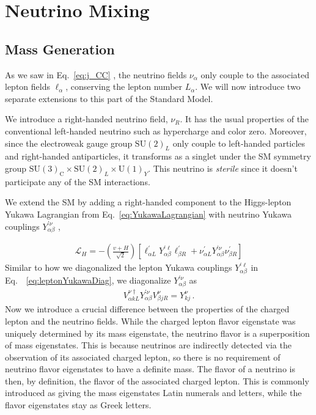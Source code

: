 %
%

\section{Neutrino Mixing}\label{ch:oscillation}
\subsection{Mass Generation}
As we saw in Eq.~\ref{eq:j_CC}
, the neutrino fields $\nu_\alpha$ only couple to the associated lepton fields $\ell_\alpha$, conserving the lepton number $L_\alpha$. We will now introduce two separate extensions to this part of the Standard Model.

We introduce a right-handed neutrino field, $\nu_R$. It has the usual properties of the conventional left-handed neutrino such as hypercharge and color zero. Moreover, since the electroweak gauge group $\text{SU}(2)_L$ only couple to left-handed particles and right-handed antiparticles, it transforms as a singlet under the SM symmetry group $\mathrm{SU}(3)_{\mathrm{C}} \times \mathrm{SU}(2)_{L} \times \mathrm{U}(1)_{Y}$. This neutrino is \emph{sterile} since it doesn't participate any of the SM interactions. 

We extend the SM by adding a right-handed component to the Higgs-lepton Yukawa Lagrangian from Eq.~\ref{eq:YukawaLagrangian} with neutrino Yukawa couplings $Y_{\alpha \beta}^{\prime \nu}$ ,

\begin{align}
    \mathcal{L}_{H}=-\left( \frac{v + H}{\sqrt{2}} \right) \left[\ell_{\alpha L}^{\prime} Y_{\alpha \beta}^{\prime \ell} \ell_{\beta R}^{\prime} + \nu_{\alpha L}^{\prime} Y_{\alpha \beta}^{\prime \nu} \nu_{\beta R}^{\prime}\right]
\end{align}
Similar to how we diagonalized the lepton Yukawa couplings $Y_{\alpha \beta}^{\prime \ell}$ in Eq.~~\ref{eq:leptonYukawaDiag}, we diagonalize $Y_{\alpha \beta}^{\prime \nu}$ as
\begin{align}
    V_{\alpha k L}^{\nu \dagger} Y^{\prime \nu}_{\alpha \beta} V_{\beta j R}^{\nu}=Y^{\nu}_{kj} \,.
\end{align}
Now we introduce a crucial difference between the properties of the charged lepton and the neutrino fields.
While the charged lepton flavor eigenstate was uniquely determined by its mass eigenstate, the neutrino flavor is a superposition of mass eigenstates. This is because neutrinos are indirectly detected via the observation of its associated charged lepton, so there is no requirement of neutrino flavor eigenstates to have a definite mass. The flavor of a neutrino is then, by definition, the flavor of the associated charged lepton. This is commonly introduced as giving the mass eigenstates Latin numerals and letters, while the flavor eigenstates stay as Greek letters.

